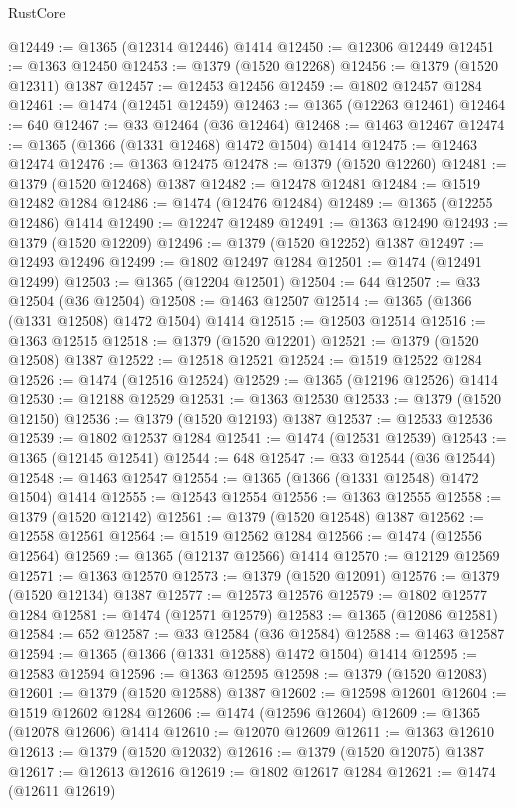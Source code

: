 \begin{lexlean}{RustCore}
\begin{coremodule}
@12449 := @1365 (@12314 @12446) @1414
@12450 := @12306 @12449
@12451 := @1363 @12450
@12453 := @1379 (@1520 @12268)
@12456 := @1379 (@1520 @12311) @1387
@12457 := @12453 @12456
@12459 := @1802 @12457 @1284
@12461 := @1474 (@12451 @12459)
@12463 := @1365 (@12263 @12461)
@12464 := 640
@12467 := @33 @12464 (@36 @12464)
@12468 := @1463 @12467
@12474 := @1365 (@1366 (@1331 @12468) @1472 @1504) @1414
@12475 := @12463 @12474
@12476 := @1363 @12475
@12478 := @1379 (@1520 @12260)
@12481 := @1379 (@1520 @12468) @1387
@12482 := @12478 @12481
@12484 := @1519 @12482 @1284
@12486 := @1474 (@12476 @12484)
@12489 := @1365 (@12255 @12486) @1414
@12490 := @12247 @12489
@12491 := @1363 @12490
@12493 := @1379 (@1520 @12209)
@12496 := @1379 (@1520 @12252) @1387
@12497 := @12493 @12496
@12499 := @1802 @12497 @1284
@12501 := @1474 (@12491 @12499)
@12503 := @1365 (@12204 @12501)
@12504 := 644
@12507 := @33 @12504 (@36 @12504)
@12508 := @1463 @12507
@12514 := @1365 (@1366 (@1331 @12508) @1472 @1504) @1414
@12515 := @12503 @12514
@12516 := @1363 @12515
@12518 := @1379 (@1520 @12201)
@12521 := @1379 (@1520 @12508) @1387
@12522 := @12518 @12521
@12524 := @1519 @12522 @1284
@12526 := @1474 (@12516 @12524)
@12529 := @1365 (@12196 @12526) @1414
@12530 := @12188 @12529
@12531 := @1363 @12530
@12533 := @1379 (@1520 @12150)
@12536 := @1379 (@1520 @12193) @1387
@12537 := @12533 @12536
@12539 := @1802 @12537 @1284
@12541 := @1474 (@12531 @12539)
@12543 := @1365 (@12145 @12541)
@12544 := 648
@12547 := @33 @12544 (@36 @12544)
@12548 := @1463 @12547
@12554 := @1365 (@1366 (@1331 @12548) @1472 @1504) @1414
@12555 := @12543 @12554
@12556 := @1363 @12555
@12558 := @1379 (@1520 @12142)
@12561 := @1379 (@1520 @12548) @1387
@12562 := @12558 @12561
@12564 := @1519 @12562 @1284
@12566 := @1474 (@12556 @12564)
@12569 := @1365 (@12137 @12566) @1414
@12570 := @12129 @12569
@12571 := @1363 @12570
@12573 := @1379 (@1520 @12091)
@12576 := @1379 (@1520 @12134) @1387
@12577 := @12573 @12576
@12579 := @1802 @12577 @1284
@12581 := @1474 (@12571 @12579)
@12583 := @1365 (@12086 @12581)
@12584 := 652
@12587 := @33 @12584 (@36 @12584)
@12588 := @1463 @12587
@12594 := @1365 (@1366 (@1331 @12588) @1472 @1504) @1414
@12595 := @12583 @12594
@12596 := @1363 @12595
@12598 := @1379 (@1520 @12083)
@12601 := @1379 (@1520 @12588) @1387
@12602 := @12598 @12601
@12604 := @1519 @12602 @1284
@12606 := @1474 (@12596 @12604)
@12609 := @1365 (@12078 @12606) @1414
@12610 := @12070 @12609
@12611 := @1363 @12610
@12613 := @1379 (@1520 @12032)
@12616 := @1379 (@1520 @12075) @1387
@12617 := @12613 @12616
@12619 := @1802 @12617 @1284
@12621 := @1474 (@12611 @12619)

\end{coremodule}
\end{lexlean}

